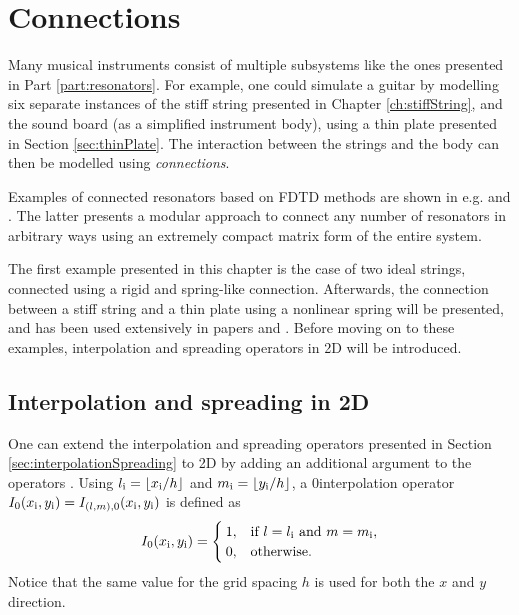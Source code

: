 \chapter{Connections}\label{ch:connections}
Many musical instruments consist of multiple subsystems like the ones presented in Part \ref{part:resonators}. For example, one could simulate a guitar by modelling six separate instances of the stiff string presented in Chapter \ref{ch:stiffString}, and the sound board (as a simplified instrument body), using a thin plate presented in Section \ref{sec:thinPlate}. 
The interaction between the strings and the body can then be modelled using \textit{connections}. %

Examples of connected resonators based on FDTD methods are shown in e.g. \cite{theBible} and \cite{Bilbao2009Modular}. The latter presents a modular approach to connect any number of resonators in arbitrary ways using an extremely compact matrix form of the entire system.

The first example presented in this chapter is the case of two ideal strings, connected using a rigid and spring-like connection. Afterwards, the connection between a stiff string and a thin plate using a nonlinear spring will be presented, and has been used extensively in papers \citeP[A] and \citeP[B]. Before moving on to these examples, interpolation and spreading operators in 2D will be introduced.

\section{Interpolation and spreading in 2D}\label{sec:interpolationSpreading2D}
One can extend the interpolation and spreading operators presented in Section \ref{sec:interpolationSpreading} to 2D by adding an additional argument to the operators \cite{theBible}. Using $l_\itxt = \floor[x_\itxt / h]$ and $m_\itxt = \floor[y_\itxt / h]$, a $0$\thOrder interpolation operator $I_0(x_{\text{i}}, y_{\text{i}}) = I_{(l, m), 0}(x_{\text{i}}, y_{\text{i}})$ is defined as
\begin{equation}
    I_0(x_{\text{i}}, y_{\text{i}}) = \begin{cases}
        1, & \text{if } l = l_{\text{i}} \text{ and } m = m_{\text{i}},\\
        0, & \text{otherwise}.
    \end{cases}
\end{equation}
Notice that the same value for the grid spacing $h$ is used for both the $x$ and $y$ direction.

